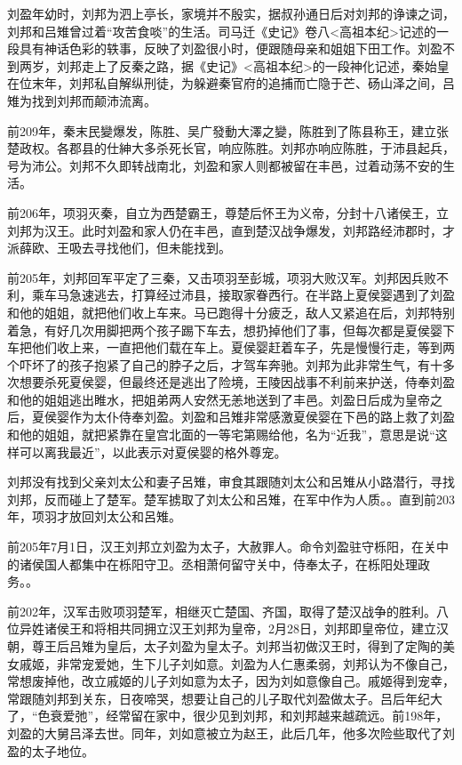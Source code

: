 刘盈年幼时，刘邦为泗上亭长，家境并不殷实，据叔孙通日后对刘邦的诤谏之词，刘邦和吕雉曾过着“攻苦食啖”的生活。司马迁《史记》卷八<高祖本纪>记述的一段具有神话色彩的轶事，反映了刘盈很小时，便跟随母亲和姐姐下田工作。刘盈不到两岁，刘邦走上了反秦之路，据《史记》<高祖本纪>的一段神化记述，秦始皇在位末年，刘邦私自解纵刑徒，为躲避秦官府的追捕而亡隐于芒、砀山泽之间，吕雉为找到刘邦而颠沛流离。

前209年，秦末民變爆发，陈胜、吴广發動大澤之變，陈胜到了陈县称王，建立张楚政权。各郡县的仕紳大多杀死长官，响应陈胜。刘邦亦响应陈胜，于沛县起兵，号为沛公。刘邦不久即转战南北，刘盈和家人则都被留在丰邑，过着动荡不安的生活。

前206年，项羽灭秦，自立为西楚霸王，尊楚后怀王为义帝，分封十八诸侯王，立刘邦为汉王。此时刘盈和家人仍在丰邑，直到楚汉战争爆发，刘邦路经沛郡时，才派薛欧、王吸去寻找他们，但未能找到。

前205年，刘邦回军平定了三秦，又击项羽至彭城，项羽大败汉军。刘邦因兵败不利，乘车马急速逃去，打算经过沛县，接取家眷西行。在半路上夏侯婴遇到了刘盈和他的姐姐，就把他们收上车来。马已跑得十分疲乏，敌人又紧追在后，刘邦特别着急，有好几次用脚把两个孩子踢下车去，想扔掉他们了事，但每次都是夏侯婴下车把他们收上来，一直把他们载在车上。夏侯婴赶着车子，先是慢慢行走，等到两个吓坏了的孩子抱紧了自己的脖子之后，才驾车奔驰。刘邦为此非常生气，有十多次想要杀死夏侯婴，但最终还是逃出了险境，王陵因战事不利前来护送，侍奉刘盈和他的姐姐逃出睢水，把姐弟两人安然无恙地送到了丰邑。刘盈日后成为皇帝之后，夏侯婴作为太仆侍奉刘盈。刘盈和吕雉非常感激夏侯婴在下邑的路上救了刘盈和他的姐姐，就把紧靠在皇宫北面的一等宅第赐给他，名为“近我”，意思是说“这样可以离我最近”，以此表示对夏侯婴的格外尊宠。

刘邦没有找到父亲刘太公和妻子呂雉，审食其跟随刘太公和呂雉从小路潜行，寻找刘邦，反而碰上了楚军。楚军掳取了刘太公和呂雉，在军中作为人质。。直到前203年，项羽才放回刘太公和呂雉。

前205年7月1日，汉王刘邦立刘盈为太子，大赦罪人。命令刘盈驻守栎阳，在关中的诸侯国人都集中在栎阳守卫。丞相萧何留守关中，侍奉太子，在栎阳处理政务。。

前202年，汉军击败项羽楚军，相继灭亡楚国、齐国，取得了楚汉战争的胜利。八位异姓诸侯王和将相共同拥立汉王刘邦为皇帝，2月28日，刘邦即皇帝位，建立汉朝，尊王后吕雉为皇后，太子刘盈为皇太子。刘邦当初做汉王时，得到了定陶的美女戚姬，非常宠爱她，生下儿子刘如意。刘盈为人仁惠柔弱，刘邦认为不像自己，常想废掉他，改立戚姬的儿子刘如意为太子，因为刘如意像自己。戚姬得到宠幸，常跟随刘邦到关东，日夜啼哭，想要让自己的儿子取代刘盈做太子。吕后年纪大了，“色衰爱弛”，经常留在家中，很少见到刘邦，和刘邦越来越疏远。前198年，刘盈的大舅吕泽去世。同年，刘如意被立为赵王，此后几年，他多次险些取代了刘盈的太子地位。

